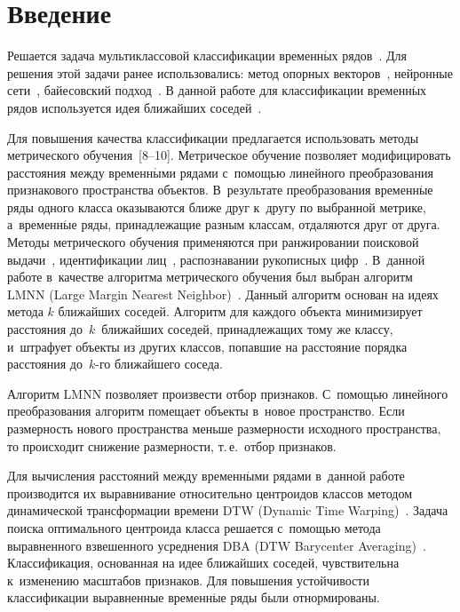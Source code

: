 
\thispagestyle{headings}

\begin{multicols}{2}

\label{st\stat}

\section{Введение}

Решается задача мультиклассовой классификации временн$\acute{\mbox{ы}}$х 
рядов~\cite{popova2015multiclass, ignatov2015multiclass}.
Для решения этой задачи ранее использовались: метод опорных 
векторов~\cite{guler2007mccsvm, ubeyli2007mccsvm2}, нейронные 
сети~\cite{anand1995mccnn}, байесовский подход~\cite{kafai2012mccbn}.
В данной работе для классификации временн$\acute{\mbox{ы}}$х рядов используется идея 
ближайших соседей~\cite{chaovalitwongse2007knn}.

Для повышения качества классификации предлагается использовать методы 
метрического обучения~[8--10].
Метрическое обучение позволяет модифицировать расстояния между временн$\acute{\mbox{ы}}$ми 
рядами с~помощью линейного преобразования признакового пространства объектов.
В~результате преобразования временн$\acute{\mbox{ы}}$е ряды одного класса оказываются ближе 
друг к~другу по выбранной метрике, а~временн$\acute{\mbox{ы}}$е ряды, принадлежащие разным классам, 
отдаляются друг от друга.
Методы метрического обучения применяются при ранжировании поисковой 
выдачи~\cite{mcfee2010mlranking}, идентификации лиц~\cite{guillaumin2009mlface}, 
распознавании рукописных цифр~\cite{weinberger2008mldigits}.
В~данной работе в~качестве алгоритма метрического обучения был выбран 
алгоритм LMNN (Large Margin Nearest Neighbor)~\cite{weinberger2005lmnn}.
Данный алгоритм основан на идеях метода $k$ ближайших соседей.
Алгоритм для каж\-до\-го объекта минимизирует расстояния до~$k$~ближайших соседей, 
принадлежащих тому же классу, и~штрафует объекты из других классов, попавшие 
на расстояние порядка расстояния до~$k$-го ближайшего соседа.

Алгоритм LMNN позволяет произвести отбор признаков.
С~помощью линейного преобразования алгоритм помещает объекты в~новое пространство.
Если размерность нового пространства меньше размерности исходного пространства, 
то происходит снижение размерности, т.\,е.\ отбор признаков.

Для вычисления расстояний между временн$\acute{\mbox{ы}}$ми рядами в~данной работе 
производится 
их выравнивание относительно центроидов классов 
методом динамической трансформации времени DTW 
(Dynamic Time Warping)~\cite{berndt1994dtw}.
Задача поиска оптимального центроида класса решается с~помощью метода 
выравненного взвешенного усреднения DBA (DTW Barycenter Averaging)~\cite{petitjean2011dba}.
Классификация, основанная на идее ближайших соседей, чувствительна 
к~изменению масштабов признаков.
Для повышения устойчивости классификации выравненные временн$\acute{\mbox{ы}}$е ряды были 
отнормированы.


\end{multicols}
